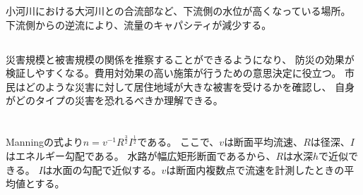 \documentclass[a4paper]{jsarticle}
\begin{document}
\subsubsection{}
小河川における大河川との合流部など、下流側の水位が高くなっている場所。
下流側からの逆流により、流量のキャパシティが減少する。

\subsection{}
災害規模と被害規模の関係を推察することができるようになり、
防災の効果が検証しやすくなる。費用対効果の高い施策が行うための意思決定に役立つ。
市民はどのような災害に対して居住地域が大きな被害を受けるかを確認し、
自身がどのタイプの災害を恐れるべきか理解できる。

\section{}
\subsection{}
Manningの式より$n = v^{-1} R^{\frac{3}{2}} I^{\frac{1}{2}}$である。
ここで、$v$は断面平均流速、$R$は径深、$I$はエネルギー勾配である。
水路が幅広矩形断面であるから、$R$は水深$h$で近似できる。
$I$は水面の勾配で近似する。$v$は断面内複数点で流速を計測したときの平均値とする。

\subsection{}
\end{document}
